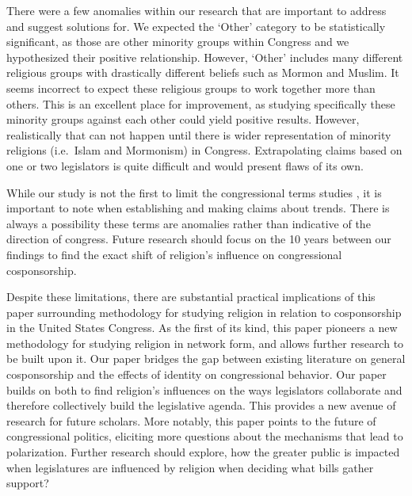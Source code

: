 \documentclass[Royal,times,sageh]{sagej}
\begin{document}
There were a few anomalies within our research that are important to
address and suggest solutions for. We expected the `Other' category to
be statistically significant, as those are other minority groups within
Congress and we hypothesized their positive relationship. However,
`Other' includes many different religious groups with drastically
different beliefs such as Mormon and Muslim. It seems incorrect to
expect these religious groups to work together more than others. This is
an excellent place for improvement, as studying specifically these
minority groups against each other could yield positive results.
However, realistically that can not happen until there is wider
representation of minority religions (i.e.~Islam and Mormonism) in
Congress. Extrapolating claims based on one or two legislators is quite
difficult and would present flaws of its own.

While our study is not the first to limit the congressional terms
studies \citep[see][]{bratton2011}, it is important to note when
establishing and making claims about trends. There is always a
possibility these terms are anomalies rather than indicative of the
direction of congress. Future research should focus on the 10 years
between our findings to find the exact shift of religion's influence on
congressional cosponsorship.

Despite these limitations, there are substantial practical implications
of this paper surrounding methodology for studying religion in relation
to cosponsorship in the United States Congress. As the first of its
kind, this paper pioneers a new methodology for studying religion in
network form, and allows further research to be built upon it. Our paper
bridges the gap between existing literature on general cosponsorship and
the effects of identity on congressional behavior. Our paper builds on
both to find religion's influences on the ways legislators collaborate
and therefore collectively build the legislative agenda. This provides a
new avenue of research for future scholars. More notably, this paper
points to the future of congressional politics, eliciting more questions
about the mechanisms that lead to polarization. Further research should
explore, how the greater public is impacted when legislatures are
influenced by religion when deciding what bills gather support?



\end{document}
